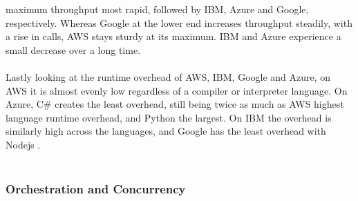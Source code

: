 \documentclass[a4paper,11pt, pagesize]{scrartcl}
\begin{document}
\begin{spacing}{1.2}
maximum throughput most rapid, followed by IBM, Azure and Google, respectively. Whereas Google at the lower end increases throughput steadily, with a rise in calls, AWS stays sturdy at its maximum. IBM and Azure experience a small decrease over a long time.\\\\ Lastly looking at the runtime overhead of AWS, IBM, Google and Azure, on AWS it is almost evenly low regardless of a compiler or interpreter language. On Azure, C\# creates the least overhead, still being twice as much as AWS highest language runtime overhead, and Python the largest. On IBM the overhead is similarly high across the languages, and Google has the least overhead with Nodejs \cite{pawlik2019performance}.\\\\ 
\subsubsection{Orchestration and Concurrency}

\end{spacing}
\end{document}
